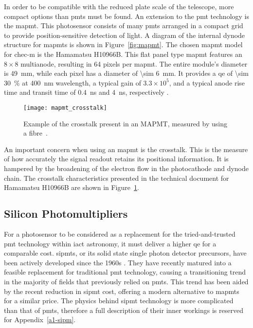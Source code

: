 In order to be compatible with the reduced plate scale of the telescope, more compact options than \glspl{pmt} must be found. An extension to the \gls{pmt} technology is the \gls{mapmt}. This photosensor consists of many \glspl{pmt} arranged in a compact grid to provide position-sensitive detection of light. A diagram of the internal dynode structure for \glspl{mapmt} is shown in Figure~\ref{fig:mapmt}. The chosen \gls{mapmt} model for \gls{chec-m} is the Hamamatsu H10966B. This flat panel type \gls{mapmt} features an $8 \times 8$ multianode, resulting in 64 pixels per \gls{mapmt}. The entire module's diameter is \SI{49}{mm}, while each pixel has a diameter of \SI{\sim 6}{mm}. It provides a \gls{qe} of \SI{\sim 30}{\percent} at \SI{400}{nm} wavelength, a typical gain of $3.3 \times 10^5$, and a typical anode rise time and transit time of \SI{0.4}{ns} and \SI{4}{ns}, respectively \cite{Hamamatsu2011}. 

\begin{figure}
	\centering
    \texttt{[image: mapmt\_crosstalk]} 
	\caption[Multi-Anode Photomultiplier Tube crosstalk.]{Example of the crosstalk present in an MAPMT, measured by using a fibre~\cite{Hamamatsu2011}.}
	\label{fig:mapmt_crosstalk}
\end{figure}

An important concern when using an \gls{mapmt} is the crosstalk. This is the measure of how accurately the signal readout retains its positional information. It is hampered by the broadening of the electron flow in the photocathode and dynode chain. The crosstalk characteristics presented in the technical document for Hamamatsu H10966B are shown in Figure~\ref{fig:mapmt_crosstalk}.

\subsection{Silicon Photomultipliers}

For a photosensor to be considered as a replacement for the tried-and-trusted \gls{pmt} technology within \gls{iact} astronomy, it must deliver a higher \gls{qe} for a comparable cost. \glspl{sipmt}, or its solid state single photon detector precursors, have been actively developed since the 1960s \cite{Renker2006}. They have recently matured into a feasible replacement for traditional \gls{pmt} technology, causing a transitioning trend in the majority of fields that previously relied on \glspl{pmt}. This trend has been aided by the recent reduction in \gls{sipmt} cost, offering a modern alternative to \glspl{mapmt} for a similar price. The physics behind \gls{sipmt} technology is more complicated than that of \glspl{pmt}, therefore a full description of their inner workings is reserved for Appendix~\ref{a1-sipm}.

